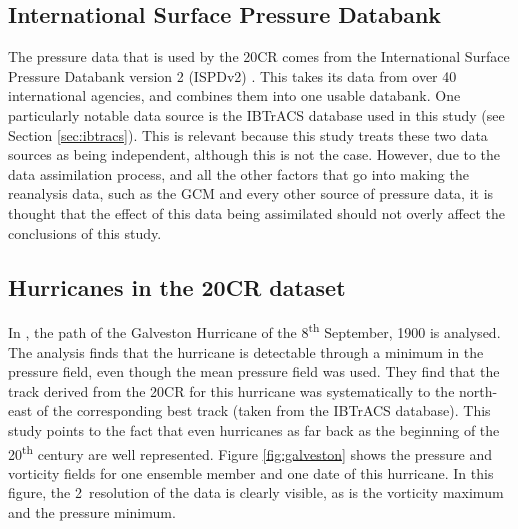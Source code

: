 \documentclass[pdftex,12pt,a4paper]{report}
\newcommand{\ts}{\textsuperscript}
\begin{document}
\subsection{International Surface Pressure Databank}
\label{sec:ispd}
The pressure data that is used by the 20CR comes from the International Surface Pressure Databank
version 2 (ISPDv2) \parencite{yin2008international}. This takes its data from over 40 international
agencies, and combines them into one usable databank. One particularly notable data source is the
IBTrACS database used in this study (see Section \ref{sec:ibtracs}). This is relevant because this
study treats these two data sources as being independent, although this is not the case. However,
due to the data assimilation process, and all the other factors that go into making the reanalysis
data, such as the GCM and every other source of pressure data, it is thought that the effect of this
data being assimilated should not overly affect the conclusions of this study. 



\subsection{Hurricanes in the 20CR dataset}

In \textcite{neff2013analysis}, the path of the Galveston Hurricane of the 8\ts{th} September, 1900
is analysed. The analysis finds that the hurricane is detectable through a minimum in the pressure
field, even though the mean pressure field was used. They find that the track derived from the 20CR
for this hurricane was systematically to the north-east of the corresponding best track (taken from
the IBTrACS database). This study points to the fact that even hurricanes as far back as the
beginning of the 20\ts{th} century are well represented. Figure \ref{fig:galveston} shows the
pressure and vorticity fields for one ensemble member and one date of this hurricane. In this
figure, the 2\textdegree\ resolution of the data is clearly visible, as is the vorticity maximum and
the pressure minimum.
\end{document}

